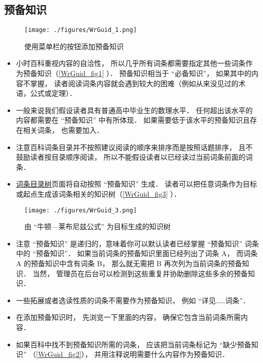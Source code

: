 
\begin{issues}
\issueTODO 
\end{issues}

\subsection{预备知识}
\begin{figure}[ht]
\centering
\texttt{[image: ./figures/WrGuid\_1.png]}
\caption{使用菜单栏的按钮添加预备知识} \label{WrGuid_fig1}
\end{figure}

\begin{itemize}
\item 小时百科重视内容的自洽性， 所以几乎所有词条都需要指定其他一些词条作为预备知识（\autoref{WrGuid_fig1} ）． 预备知识相当于 “必备知识”， 如果其中的内容不掌握， 读者阅读词条内容就会遇到较大的困难（例如从来没见过的术语，公式或定理）．
\item 一般来说我们假设读者具有普通高中毕业生的数理水平． 任何超出该水平的内容都需要在 “预备知识” 中有所体现． 如果需要低于该水平的预备知识且存在相关词条， 也需要加入．
\item 注意百科词条目录并不按照建议阅读的顺序来排序而是按照话题排序， 且不鼓励读者按目录顺序阅读， 所以不能假设读者以已经读过当前词条前面的词条．
\item \href{http://wuli.wiki/tree/}{词条目录树}页面将自动按照 “预备知识” 生成． 读者可以把任意词条作为目标或起点生成该词条相关的知识树（\autoref{WrGuid_fig3} ）．
\end{itemize}

\begin{figure}[ht]
\centering
\texttt{[image: ./figures/WrGuid\_3.png]}
\caption{由 “牛顿—莱布尼兹公式” 为目标生成的知识树} \label{WrGuid_fig3}
\end{figure}

\begin{itemize}
\item 注意 “预备知识” 是递归的，意味着你可以默认读者已经掌握 “预备知识” 词条中的 “预备知识”． 如果当前词条的预备知识里面已经列出了词条 A， 而词条 A 的预备知识中含有词条 B， 那么就无需把 B 再次列为当前词条的预备知识． 当然， 管理员在后台可以检测到这些重复并协助删除这些多余的预备知识．
\item 一些拓展或者选读性质的词条不需要作为预备知识， 例如 “详见……词条”．
\item 在添加预备知识时， 先浏览一下里面的内容， 确保它包含当前词条所需内容．
\item 如果百科中找不到预备知识所需的词条， 应该把当前词条标记为 “缺少预备知识” （\autoref{WrGuid_fig2}）， 并用注释说明需要什么内容作为预备知识．
\end{itemize}

